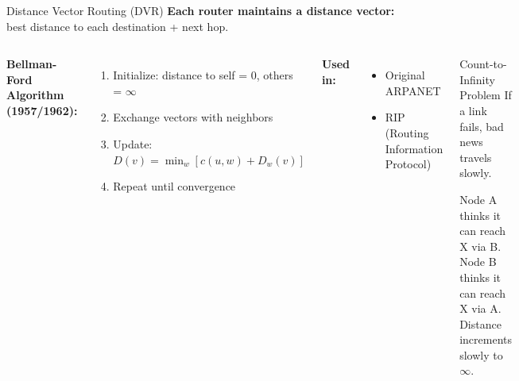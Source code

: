 \documentclass[aspectratio=169,11pt]{beamer}
\begin{document}
\begin{frame}{Distance Vector Routing (DVR)}
    \textbf{Each router maintains a distance vector:} best distance to each destination + next hop.
    
    \vspace{0.3cm}
    \begin{columns}
        \textbf{Bellman-Ford Algorithm (1957/1962):}
        \begin{enumerate}
            \item Initialize: distance to self = 0, others = $\infty$
            \item Exchange vectors with neighbors
            \item Update: $D(v) = \min_w[c(u,w) + D_w(v)]$
            \item Repeat until convergence
        \end{enumerate}
        
        \vspace{0.3cm}
        \textbf{Used in:}
        \begin{itemize}
            \item Original ARPANET
            \item RIP (Routing Information Protocol)
        \end{itemize}
        
        \begin{alertblock}{Count-to-Infinity Problem}
            If a link fails, bad news travels slowly.
            
            \vspace{0.2cm}
            Node A thinks it can reach X via B.
            Node B thinks it can reach X via A.
            Distance increments slowly to $\infty$.
        \end{alertblock}
    \end{columns}
\end{frame}
\end{document}
